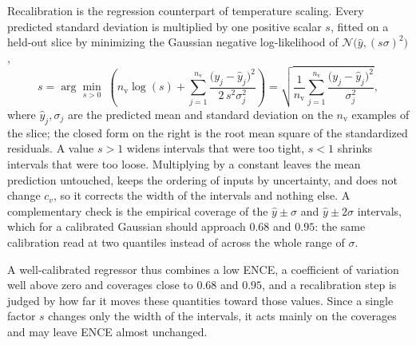         Recalibration is the regression counterpart of temperature scaling. Every
        predicted standard deviation is multiplied by one positive scalar $s$, fitted on
        a held-out slice by minimizing the Gaussian negative log-likelihood of
        $\mathcal{N}\!\bigl( \hat{y}, (s\sigma)^{2} \bigr)$,
        \begin{equation}
            s = \arg\min_{s > 0} \; 
            \left( n_{\mathrm{v}} \log (s)
            + \sum_{j=1}^{n_{\mathrm{v}}}\frac{\bigl( y_j - \hat{y}_j \bigr)^{2}}{2\, s^{2} \sigma_j^{2}} \right)
            = \sqrt{ \frac{1}{n_{\mathrm{v}}} \sum_{j=1}^{n_{\mathrm{v}}}
            \frac{\bigl( y_j - \hat{y}_j \bigr)^{2}}{\sigma_j^{2}} } ,
            \label{eq:bg:unc:sigmafit}
        \end{equation}
        where $\hat{y}_j, \sigma_j$ are the predicted mean and standard deviation on the
        $n_{\mathrm{v}}$ examples of the slice; the closed form on the right is the root mean square
        of the standardized residuals. A value $s > 1$ widens intervals that were too
        tight, $s < 1$ shrinks intervals that were too loose. Multiplying by a constant
        leaves the mean prediction untouched, keeps the ordering of inputs by
        uncertainty, and does not change $c_v$, so it corrects the width of the
        intervals and nothing else. A complementary check is the empirical coverage
        of the $\hat{y} \pm \sigma$ and $\hat{y} \pm 2\sigma$ intervals, which for a
        calibrated Gaussian should approach $0.68$ and $0.95$: the same calibration
        read at two quantiles instead of across the whole range of $\sigma$.

        A well-calibrated regressor thus combines a low ENCE, a coefficient of
        variation well above zero and coverages close to $0.68$ and $0.95$, and a
        recalibration step is judged by how far it moves these quantities toward
        those values. Since a single factor $s$ changes only the width of the
        intervals, it acts mainly on the coverages and may leave ENCE almost
        unchanged.

